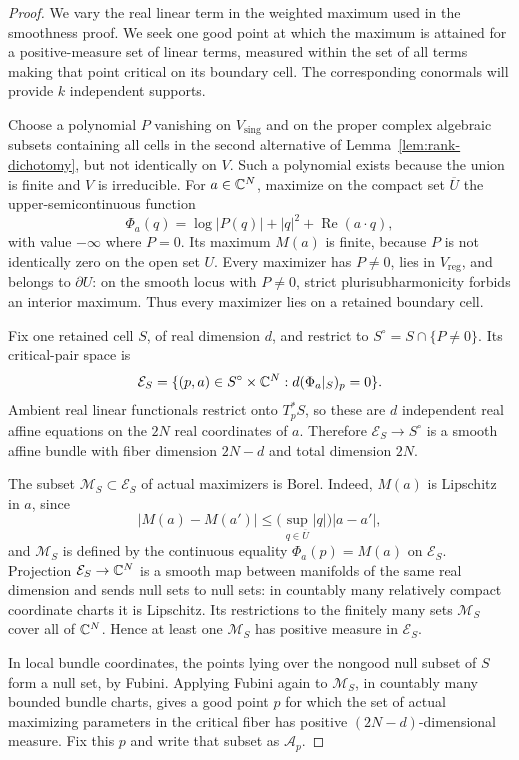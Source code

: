 \begin{proof}
We vary the real linear term in the weighted maximum used in the
smoothness proof.  We seek one good point at which the maximum is
attained for a positive-measure set of linear terms, measured within
the set of all terms making that point critical on its boundary cell.
The corresponding conormals will provide $k$ independent supports.

Choose a polynomial $P$ vanishing on $V_{\mathrm{sing}}$ and on the
proper complex algebraic subsets containing all cells in the second
alternative of Lemma~\ref{lem:rank-dichotomy}, but not identically on
$V$.  Such a polynomial exists because the union is finite and $V$ is
irreducible.  For $a\in\mathbb C^N$, maximize on the compact set
$\overline U$ the upper-semicontinuous function
\[
 \Phi_a(q)=\log|P(q)|+|q|^2+\operatorname{Re}(a\cdot q),
\]
with value $-\infty$ where $P=0$.  Its maximum $M(a)$ is finite,
because $P$ is not identically zero on the open set $U$.  Every
maximizer has $P\ne0$, lies in $V_{\mathrm{reg}}$, and belongs to
$\partial U$: on the smooth locus with $P\ne0$, strict
plurisubharmonicity forbids an interior maximum.  Thus every maximizer
lies on a retained boundary cell.

Fix one retained cell $S$, of real dimension $d$, and restrict to
$S^\circ=S\cap\{P\ne0\}$.  Its critical-pair space is
\[
 \mathcal E_S=
 \{(p,a)\in S^\circ\times\mathbb C^N:
                  d(\Phi_a|_S)_p=0\}.
\]
Ambient real linear functionals restrict onto $T_p^*S$, so these are
$d$ independent real affine equations on the $2N$ real coordinates
of $a$.  Therefore $\mathcal E_S\to S^\circ$ is a smooth affine
bundle with fiber dimension $2N-d$ and total dimension $2N$.

The subset $\mathcal M_S\subset\mathcal E_S$ of actual maximizers
is Borel.  Indeed, $M(a)$ is Lipschitz in $a$, since
\[
 |M(a)-M(a')|
 \leq\bigl(\sup_{q\in\overline U}|q|\bigr)|a-a'|,
\]
and $\mathcal M_S$ is defined by the continuous equality
$\Phi_a(p)=M(a)$ on $\mathcal E_S$.  Projection
$\mathcal E_S\to\mathbb C^N$ is a smooth map between manifolds of the
same real dimension and sends null sets to null sets: in countably
many relatively compact coordinate charts it is Lipschitz.  Its
restrictions to the finitely many sets $\mathcal M_S$ cover all of
$\mathbb C^N$.  Hence at least one $\mathcal M_S$ has positive measure in
$\mathcal E_S$.

In local bundle coordinates, the points lying over the nongood null
subset of $S$ form a null set, by Fubini.  Applying Fubini again to
$\mathcal M_S$, in countably many bounded bundle charts, gives a
good point $p$ for which the set of actual maximizing parameters in
the critical fiber has positive $(2N-d)$-dimensional measure.  Fix
this $p$ and write that subset as $\mathcal A_p$.


\end{proof}

